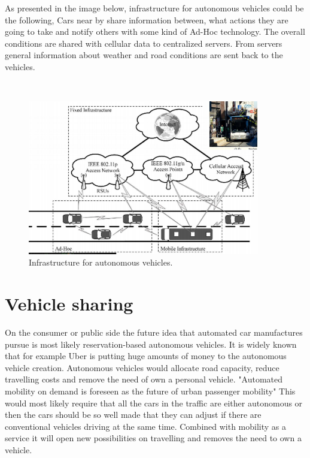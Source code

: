\documentclass[english]{tktltiki}
\begin{document}
As presented in the image below, infrastructure for autonomous vehicles could be the following, \cite{trafficmodels} Cars near by share information between, what actions they are going to take and notify others with some kind of Ad-Hoc technology. The overall conditions are shared with cellular data to centralized servers. From servers general information about weather and road conditions are sent back to the vehicles. 

\begin{figure}[h]
\ \newline
\begin{center}
\includegraphics[width=0.9\textwidth]{infra.png}
\caption{Infrastructure for autonomous vehicles. 
\cite{trafficmodels}}
\label{infrastructure}
\end{center}
\end{figure}


\section{Vehicle sharing}
On the consumer or public side the future idea that automated car manufactures 
pursue is most likely reservation-based autonomous vehicles. It is widely known 
that for example Uber is putting huge amounts of money to the autonomous vehicle 
creation. Autonomous vehicles would allocate road capacity, reduce travelling 
costs and remove the need of own a personal vehicle. \cite{ondemand} "Automated 
mobility on demand is foreseen as the future of urban passenger mobility" 
\cite{ondemand} This would most likely require that all the cars in the traffic 
are either autonomous or then the cars should be so well made that they can 
adjust if there are conventional vehicles driving at the same time. Combined 
with mobility as a service it will open new possibilities on travelling and 
removes the need to own a vehicle. 
\end{document}
